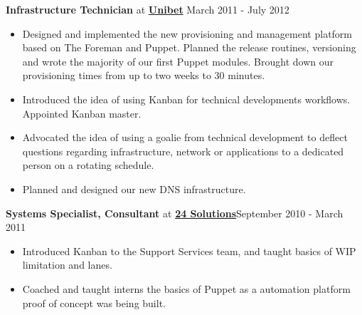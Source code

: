 \documentclass[8pt]{article}
\newenvironment{outerlist}[1][\enskip\textbullet]%
        {\begin{itemize}[#1]}{\end{itemize}%
         \vspace{-.6\baselineskip}}
\newcommand{\blankline}{\quad\pagebreak[2]}
\begin{document}
\textbf{Infrastructure Technician} at \href{http://www.unibet.com}{\textbf{Unibet}}  \hfill {March 2011 - July 2012}
\begin{outerlist}
	 \item Designed and implemented the new provisioning and management platform based on The Foreman and Puppet. Planned the release routines, versioning and wrote the majority of our first Puppet modules. Brought down our provisioning times from up to two weeks to 30 minutes.
	\item Introduced the idea of using Kanban for technical developments workflows. Appointed Kanban master.
	\item Advocated the idea of using a goalie from technical development to deflect questions regarding infrastructure, network or applications to a dedicated person on a rotating schedule.
	\item Planned and designed our new DNS infrastructure.
\end{outerlist}
\blankline

 \textbf{Systems Specialist, Consultant} at \href{http://www.24solutions.se}{\textbf{24 Solutions}}\hfill {September 2010 - March 2011}
\begin{outerlist}
	\item Introduced Kanban to the Support Services team, and taught basics of WIP limitation and lanes.
	\item Coached and taught interns the basics of Puppet as a automation platform proof of concept was being built.
\end{outerlist}
\blankline
\end{document}

